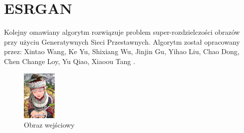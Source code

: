 \chapter{ESRGAN}

Kolejny omawiany algorytm rozwiązuje problem super-rozdzielczości obrazów przy użyciu Generatywnych Sieci Przestawnych. Algorytm został opracowany przez: Xintao Wang, Ke Yu, Shixiang Wu, Jinjin Gu, Yihao Liu,
Chao Dong, Chen Change Loy, Yu Qiao, Xiaoou Tang \cite{wang2018esrgan}.




\begin{figure}[ht]
    \centering
    \begin{minipage}[t]{0.4\linewidth}
        \includegraphics[width=\linewidth]{Rozdziały/02.Podstawy_teoretyczne/Obrazy/comic.png}
        \caption{Obraz wejściowy}
        \label{fig:image60}

\end{minipage}
\end{figure}
